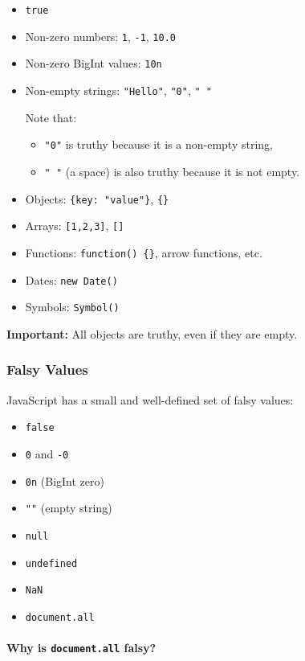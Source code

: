 \documentclass{scrbook}
\begin{document}
\begin{itemize}
    \item \texttt{true}
    \item Non-zero numbers: \texttt{1}, \texttt{-1}, \texttt{10.0}
    \item Non-zero BigInt values: \texttt{10n}
    \item Non-empty strings: \texttt{"Hello"}, \texttt{"0"}, \texttt{" "}
    
    Note that:
    \begin{itemize}
        \item \texttt{"0"} is truthy because it is a non-empty string,
        \item \texttt{" "} (a space) is also truthy because it is not empty.
    \end{itemize}

    \item Objects: \texttt{\{key: "value"\}}, \texttt{\{\}}
    \item Arrays: \texttt{[1,2,3]}, \texttt{[]}
    \item Functions: \texttt{function() \{\}}, arrow functions, etc.
    \item Dates: \texttt{new Date()}
    \item Symbols: \texttt{Symbol()}
\end{itemize}

\textbf{Important:} All objects are truthy, even if they are empty.

\subsubsection*{Falsy Values}

JavaScript has a small and well-defined set of falsy values:

\begin{itemize}
    \item \texttt{false}
    \item \texttt{0} and \texttt{-0}
    \item \texttt{0n} (BigInt zero)
    \item \texttt{""} (empty string)
    \item \texttt{null}
    \item \texttt{undefined}
    \item \texttt{NaN}
    \item \texttt{document.all}
\end{itemize}

\paragraph{Why is \texttt{document.all} falsy?}
\end{document}
